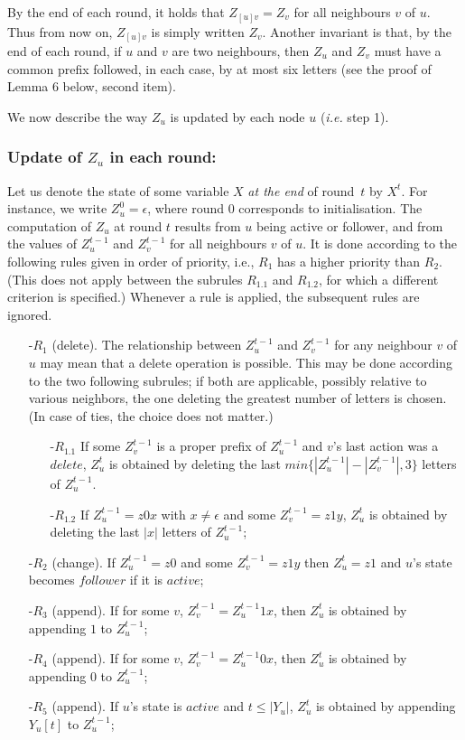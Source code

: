 \documentclass[11pt,envcountsame,letterpaper]{llncs}
\begin{document}
By the end of each round, it holds that $Z_{[u]v}=Z_v$ for all neighbours $v$ of $u$.
Thus from now on, $Z_{[u]v}$  is simply written $Z_v$. Another invariant is that, by the end of each round, if $u$ and $v$ are two neighbours, then $Z_u$ and $Z_v$ must have a common prefix followed, in each case, by at most six letters (see the proof of Lemma 6 below, second item).

We now describe the way $Z_u$ is updated by each node $u$ ({\it i.e.} step 1).
 
\subsubsection{Update of $Z_u$ in each round:}

Let us denote the state of some variable $X$ {\em at the end} of round~$t$ by $X^t$. For instance, we write $Z_u^0=\epsilon$, where round $0$ corresponds to initialisation.
The computation of $Z_u$ at round $t$ results from $u$ being active or follower, and from the values of 
 $Z_u^{t-1}$ and $Z_v^{t-1}$ for all neighbours $v$ of $u$. 
It is done according to the following rules given in order of 
priority, i.e., $R_{1}$ has a higher priority than 
$R_2$. 
(This does not apply between the subrules $R_{1.1}$ and $R_{1.2}$, for which a different criterion is specified.)
Whenever a rule is applied, the subsequent rules are ignored.
\begin{itemize}
\item[-$R_1$] (delete). The relationship between $Z_u^{t-1}$ and $Z_v^{t-1}$ 
for any neighbour
$v$ of $u$ may mean that a delete operation is possible. This may be done according to the two following subrules; if both are applicable, possibly relative to various neighbors, the one deleting the greatest number of letters is chosen. (In case of ties, the choice does not matter.)
\begin{itemize} 
\item[-$R_{1.1}$] If some $Z_v^{t-1}$ is a proper prefix of $Z_u^{t-1}$ and $v$'s 
last action was a $delete$,
$Z_u^t$ is obtained by deleting the last $min\{|Z_u^{t-1}|-|Z_v^{t-1}|,3\}$
letters of $Z_u^{t-1}$.
\item[-$R_{1.2}$] If $Z_u^{t-1}=z0x$ with $x\neq\epsilon$ and some $Z_v^{t-1}=z1y$, 
$Z_u^t$ is obtained by deleting the last
$|x|$ letters of $Z_u^{t-1}$;
\end{itemize}
\item[-$R_2$] (change). If $Z_u^{t-1}=z0$ and some $Z_v^{t-1}=z1y$ then $Z_u^{t} = z1$    and
$u$'s state becomes    $follower$ if it is $active$;

\item[-$R_3$] (append). If  for some $v$, $Z_v^{t-1}=Z_u^{t-1}1x$, then
$Z_u^{t}$ is obtained by appending $1$ to $Z_u^{t-1}$; 
\item[-$R_4$] (append). If for some $v$,  $Z_v^{t-1}=Z_u^{t-1}0x$, then
$Z_u^{t}$ is obtained by appending $0$ to $Z_u^{t-1}$;
\item[-$R_5$] (append). If $u$'s state is $active$ and $t \le|Y_u|$,
$Z_u^t$ is obtained by
appending $Y_u[t]$ to $Z_u^{t-1}$;
\end{itemize}
\end{document}

